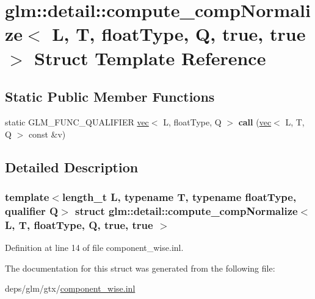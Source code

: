 \hypertarget{structglm_1_1detail_1_1compute__compNormalize_3_01L_00_01T_00_01floatType_00_01Q_00_01true_00_01true_01_4}{}\section{glm\+:\+:detail\+:\+:compute\+\_\+comp\+Normalize$<$ L, T, float\+Type, Q, true, true $>$ Struct Template Reference}
\label{structglm_1_1detail_1_1compute__compNormalize_3_01L_00_01T_00_01floatType_00_01Q_00_01true_00_01true_01_4}
\subsection*{Static Public Member Functions}
\begin{DoxyCompactItemize}
\item 
\mbox{\label{structglm_1_1detail_1_1compute__compNormalize_3_01L_00_01T_00_01floatType_00_01Q_00_01true_00_01true_01_4_aca1253c5ce571f9aa75a98377f2f38cc}} 
static G\+L\+M\+\_\+\+F\+U\+N\+C\+\_\+\+Q\+U\+A\+L\+I\+F\+I\+ER \hyperlink{structglm_1_1vec}{vec}$<$ L, float\+Type, Q $>$ {\bfseries call} (\hyperlink{structglm_1_1vec}{vec}$<$ L, T, Q $>$ const \&v)
\end{DoxyCompactItemize}


\subsection{Detailed Description}
\subsubsection*{template$<$length\+\_\+t L, typename T, typename float\+Type, qualifier Q$>$\newline
struct glm\+::detail\+::compute\+\_\+comp\+Normalize$<$ L, T, float\+Type, Q, true, true $>$}



Definition at line 14 of file component\+\_\+wise.\+inl.



The documentation for this struct was generated from the following file\+:\begin{DoxyCompactItemize}
\item 
deps/glm/gtx/\hyperlink{component__wise_8inl}{component\+\_\+wise.\+inl}\end{DoxyCompactItemize}
